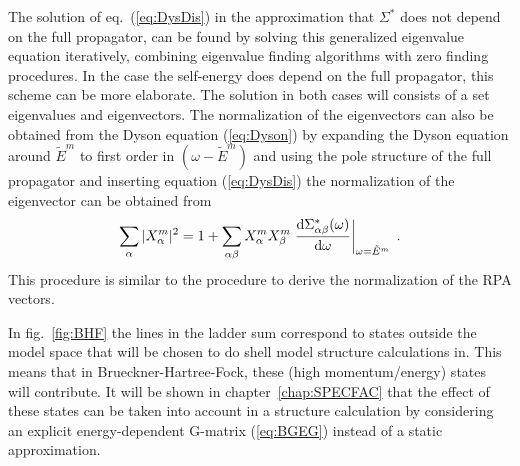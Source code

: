 The solution of eq.~(\ref{eq:DysDis}) in the approximation that $\Sigma^\ast$
does not depend on the full propagator, can be found by solving this generalized
eigenvalue equation iteratively, combining eigenvalue finding algorithms 
with zero finding procedures.
In the case the self-energy does depend on the full propagator, 
this scheme can be more elaborate.
The solution in both cases will consists of a set eigenvalues and 
eigenvectors. 
The normalization of the eigenvectors can also be obtained from the Dyson
equation (\ref{eq:Dyson}) \cite{Heng} by expanding
the Dyson equation  around $\tilde{E}^m$ to first
order in $(\omega-\tilde{E}^m)$ and using the pole structure of the full 
propagator and  inserting equation (\ref{eq:DysDis}) the normalization of
the eigenvector can be obtained from
%
	\begin{equation}
		\sum_\alpha
		|X_\alpha^m| ^2
	=
		1 
	+
		\sum_{\alpha\beta}
		X_\alpha^m
		X_\beta^m
		\left.
			\frac{ {\rm d} \Sigma^\ast_{\alpha\beta}(\omega)}
			     { {\rm d} \omega}
		\right|_{\omega = \tilde{E}^m}
	\label{eq:DysNorm}
	\;.
	\end{equation}
%
This procedure is similar to the procedure to derive the normalization of the
RPA vectors\cite{AEG93}.

In fig.~\ref{fig:BHF} the lines in the ladder sum correspond to states outside
the model space that will be chosen to do shell model structure calculations
in. This means that in Brueckner-Hartree-Fock, these (high momentum/energy)
states will contribute. It will be shown in chapter~\ref{chap:SPECFAC} that the
effect of these states can be taken into account in a structure calculation 
by considering an 
explicit energy-dependent G-matrix (\ref{eq:BGEG}) instead of a static 
approximation.
